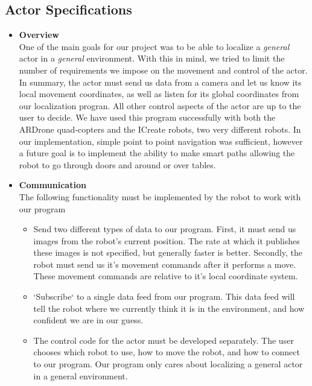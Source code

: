 \documentclass[a4paper,11pt]{article}
\begin{document}
 \subsection{Actor Specifications}
\begin{itemize}
\item \textbf{Overview} \\
One of the main goals for our project was to be able to localize a \emph{general} actor in a \emph{general} environment. With this in mind, we tried to limit the number of requirements we impose on the movement and control of the actor. In summary, the actor must send us data from a camera and let us know its local movement coordinates, as well as listen for its global coordinates from our localization progran. All other control aspects of the actor are up to the user to decide. We have used this program successfully with both the ARDrone quad-copters and the ICreate robots, two very different robots. In our implementation, simple point to point navigation was sufficient, however a future goal is to implement the ability to make smart paths allowing the robot to go through doors and around or over tables.

\item \textbf{Communication} \\
The following functionality must be implemented by the robot to work with our program
  \begin{itemize}
  \item Send two different types of data to our program. First, it must send us images from the robot's current position. The rate at which it publishes these images is not specified, but generally faster is better. Secondly, the robot must send us it's movement commands after it performs a move. These movement commands are relative to it's local coordinate system.
  \item `Subscribe` to a single data feed from our program. This data feed will tell the robot where we currently think it is in the environment, and how confident we are in our guess.
  \item The control code for the actor must be developed separately. The user chooses which robot to use, how to move the robot, and how to connect to our program. Our program only cares about localizing a general actor in a general environment.
  \end{itemize} 
\end{itemize}
\end{document}
